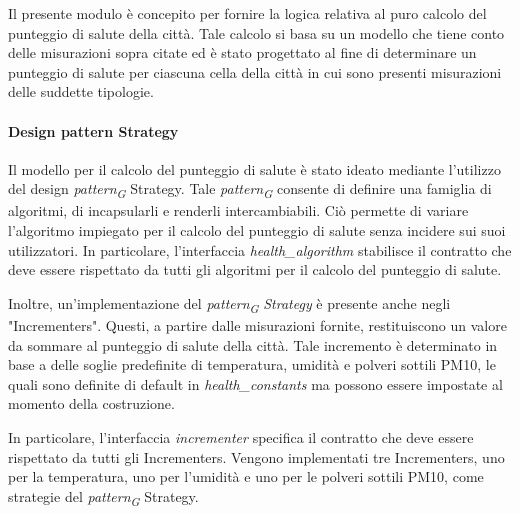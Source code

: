 Il presente modulo è concepito per fornire la logica relativa al puro calcolo del punteggio di salute della città. Tale calcolo si basa su un modello che tiene conto delle misurazioni sopra citate ed è stato progettato al fine di determinare un punteggio di salute per ciascuna cella della città in cui sono presenti misurazioni delle suddette tipologie.

\paragraph{Design pattern Strategy}

Il modello per il calcolo del punteggio di salute è stato ideato mediante l'utilizzo del design \textit{pattern}\textsubscript{\textit{G}} Strategy. Tale \textit{pattern}\textsubscript{\textit{G}} consente di definire una famiglia di algoritmi, di incapsularli e renderli intercambiabili. Ciò permette di variare l'algoritmo impiegato per il calcolo del punteggio di salute senza incidere sui suoi utilizzatori. In particolare, l'interfaccia \textit{health\_algorithm} stabilisce il contratto che deve essere rispettato da tutti gli algoritmi per il calcolo del punteggio di salute.

Inoltre, un'implementazione del \textit{pattern}\textsubscript{\textit{G}} \textit{Strategy} è presente anche negli "Incrementers". Questi, a partire dalle misurazioni fornite, restituiscono un valore da sommare al punteggio di salute della città. Tale incremento è determinato in base a delle soglie predefinite di temperatura, umidità e polveri sottili PM10, le quali sono definite di default in \textit{health\_constants} ma possono essere impostate al momento della costruzione.

In particolare, l'interfaccia \textit{incrementer} specifica il contratto che deve essere rispettato da tutti gli Incrementers. Vengono implementati tre Incrementers, uno per la temperatura, uno per l'umidità e uno per le polveri sottili PM10, come strategie del \textit{pattern}\textsubscript{\textit{G}} Strategy.

